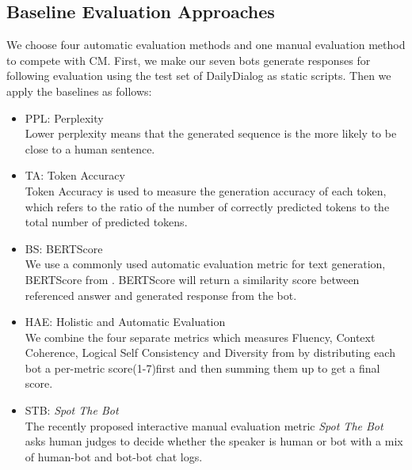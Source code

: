\subsection{Baseline Evaluation Approaches}
We choose four automatic evaluation methods and one manual evaluation 
method to compete with CM. 
First,
we make our seven bots 
generate responses for following
evaluation
using
the test set of DailyDialog \citep{li2017dailydialog} 
as static scripts. 
Then we apply the baselines as follows:
\begin{itemize}
\item PPL: Perplexity \\
Lower perplexity means that the generated sequence is 
the more likely to be close to a human sentence.
\item TA: Token Accuracy \\
Token Accuracy is used to measure the generation accuracy 
of each token, which refers to the ratio of the number of 
correctly predicted tokens to the total number of predicted tokens.
\item BS: BERTScore  \\
We use a commonly used automatic evaluation metric for text generation, 
BERTScore from \citet{zhang2019bertscore}.
BERTScore
will return a similarity score between referenced answer and generated response
from the bot.
\item HAE: Holistic and Automatic Evaluation  \\
We combine the four separate metrics which measures Fluency, Context Coherence, Logical Self Consistency and Diversity from \citet{pang-etal-2020-towards} by distributing each bot a per-metric score(1-7)first and then summing them up to get a final score. 
\item STB: \textit{Spot The Bot}  \\
The recently proposed interactive manual evaluation metric \textit{Spot The Bot} \citep{deriu-etal-2020-spot} asks human judges to decide whether the speaker is human or bot with a mix of human-bot and bot-bot chat logs.   

\end{itemize}

